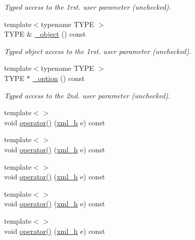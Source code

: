 \begin{DoxyCompactItemize}
\begin{DoxyCompactList}\small\item\em Typed access to the 1rst. user parameter (unchecked). \item\end{DoxyCompactList}\item 
{\footnotesize template$<$typename TYPE $>$ }\\TYPE \& \hyperlink{struct_d_d4hep_1_1_converter_a34ae0018af9b4cfadb5f7eae07b5b1a5}{\_\-object} () const 
\begin{DoxyCompactList}\small\item\em Typed object access to the 1rst. user parameter (unchecked). \item\end{DoxyCompactList}\item 
{\footnotesize template$<$typename TYPE $>$ }\\TYPE $\ast$ \hyperlink{struct_d_d4hep_1_1_converter_aebbcb36c52df173c5e3ebcfb3402008d}{\_\-option} () const 
\begin{DoxyCompactList}\small\item\em Typed access to the 2nd. user parameter (unchecked). \item\end{DoxyCompactList}\item 
{\footnotesize template$<$$>$ }\\void \hyperlink{struct_d_d4hep_1_1_converter_aed84f0c27418a0bf8a6228b2fa932c23}{operator()} (\hyperlink{class_d_d4hep_1_1_x_m_l_1_1_handle__t}{xml\_\-h} e) const
\item 
{\footnotesize template$<$$>$ }\\void \hyperlink{struct_d_d4hep_1_1_converter_a06b7fe862ec6f5f24071fe0173081f3a}{operator()} (\hyperlink{class_d_d4hep_1_1_x_m_l_1_1_handle__t}{xml\_\-h} e) const
\item 
{\footnotesize template$<$$>$ }\\void \hyperlink{struct_d_d4hep_1_1_converter_a33de33ebaf63b0a0c425f6edc4e50f68}{operator()} (\hyperlink{class_d_d4hep_1_1_x_m_l_1_1_handle__t}{xml\_\-h} e) const
\item 
{\footnotesize template$<$$>$ }\\void \hyperlink{struct_d_d4hep_1_1_converter_aa8b8c091d8882f85bfe2ff60ea470090}{operator()} (\hyperlink{class_d_d4hep_1_1_x_m_l_1_1_handle__t}{xml\_\-h} e) const
\item 
{\footnotesize template$<$$>$ }\\void \hyperlink{struct_d_d4hep_1_1_converter_a981c80325c3558372d758b0661eb1582}{operator()} (\hyperlink{class_d_d4hep_1_1_x_m_l_1_1_handle__t}{xml\_\-h} e) const

\end{DoxyCompactItemize}

